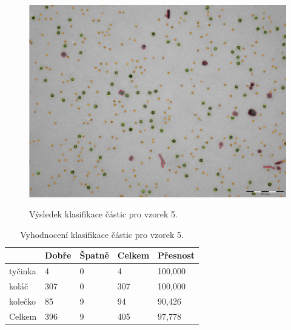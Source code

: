 \documentclass[11pt,twoside,a4paper,table]{book}
\begin{document}
\begin{figure}[h]
\center
\includegraphics[width=\textwidth]{figures/multi7_klasifikace.png}
\label{fig:class5}
\caption{Výsledek klasifikace částic pro vzorek 5.}
\end{figure}

\begin{table}[h]
\begin{center}
\begin{tabular}{lllll}
\rowcolor[HTML]{9B9B9B} 
\multicolumn{1}{|l|}{\cellcolor[HTML]{9B9B9B}Třída} & \multicolumn{1}{l|}{\cellcolor[HTML]{9B9B9B}Dobře} & \multicolumn{1}{l|}{\cellcolor[HTML]{9B9B9B}Špatně}  & \multicolumn{1}{l|}{\cellcolor[HTML]{9B9B9B}Celkem} & \multicolumn{1}{l|}{\cellcolor[HTML]{9B9B9B}Přesnost} \\ \hline
\multicolumn{1}{|l|}{tyčinka}                             & \multicolumn{1}{l|}{4}                             & \multicolumn{1}{l|}{0}                               & \multicolumn{1}{l|}{4}                              & \multicolumn{1}{l|}{100,000}                          \\ \hline
\multicolumn{1}{|l|}{koláč}                             & \multicolumn{1}{l|}{307}                           & \multicolumn{1}{l|}{0}                               & \multicolumn{1}{l|}{307}                            & \multicolumn{1}{l|}{100,000}                          \\ \hline
\multicolumn{1}{|l|}{kolečko}                             & \multicolumn{1}{l|}{85}                            & \multicolumn{1}{l|}{9}                               & \multicolumn{1}{l|}{94}                             & \multicolumn{1}{l|}{90,426}                           \\ \hline
\multicolumn{1}{|l|}{Celkem}                        & \multicolumn{1}{l|}{396}                           & \multicolumn{1}{l|}{9}                               & \multicolumn{1}{l|}{405}                            & \multicolumn{1}{l|}{97,778}                           \\ \hline
\end{tabular}
\end{center}
\caption{Vyhodnocení klasifikace částic pro vzorek 5.}
\label{tab:classresult6}
\end{table}
\end{document}

